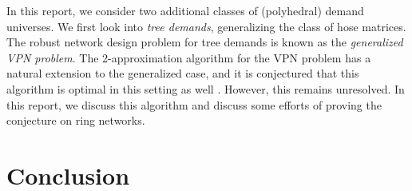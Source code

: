 \documentclass[11pt]{article}
\theoremstyle{definition}
\begin{document}
    In this report, we consider two additional classes of (polyhedral) demand universes.
    We first look into \emph{tree demands}, generalizing the class of hose matrices.
    The robust network design problem for tree demands is known as the \emph{generalized VPN problem}.
    The 2-approximation algorithm for the VPN problem has a natural extension to the generalized case, and it is conjectured that this algorithm is optimal in this setting as well \cite{OLVER2016191}.
    However, this remains unresolved.
    In this report, we discuss this algorithm and discuss some efforts of proving the conjecture on ring networks.



    

    

    \section{Conclusion}

    
    

    \clearpage
    \appendix
    
\end{document}
